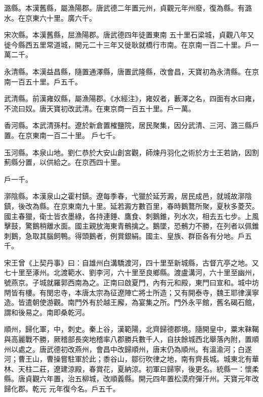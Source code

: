 \begin{pinyinscope}
 潞縣。本漢舊縣，屬漁陽郡。唐武德二年置元州，貞觀元年州廢，復為縣。有潞水。在京東六十里。廣六千。



 宋次縣。本漢舊縣，屈漁陽郡。唐武德四年徒置東南
 五十里石梁城，貞觀八年又徙今縣西五里常道城，開元二十三年又徙耿就橋行市南。在京南一百二十里。戶一萬二千。



 永清縣。本漢益昌縣，隨置通澤縣，唐置武隆縣，改會昌，天寶初為永清縣。在京南一百五十里。戶五千。



 武清縣。前漢雍奴縣，屬漁陽郡。《水經注》，雍奴者，藪澤之名，四面有水曰雍，不流曰奴。唐天寶初改武清。在東京商一百五十里。戶一萬。



 香河縣。本武清孫村。遼於新倉置榷鹽院，居民聚集，因分武清、三河、潞三縣戶置。在京東南一百二十里。
 戶七千。



 玉河縣。本泉山地。劉仁恭於大安山創宮觀，師煉丹羽化之術於方士王若訥，因割薊縣分置，以供給之。在京西四十里。



 戶一千。



 漷陰縣。本漢泉山之霍村鎮。遼每季春，弋獵於延芳澱，居民成邑，就城故漷陰鎮，後改為縣。在京東南九十里。延若澱方數百里，春時鵝鶩所聚，夏秋多菱芡。國主春獵，衛士皆衣墨綠，各持連錘、鷹食、刺鵝錐，列水次，相去五七步。上風擊鼓，驚鵝稍離水面。國主親放海東青鶻擒之。鵝墜，恐鶻力不勝，在列者以佩錐
 刺鵝，急取其腦飼鴨。得頭鵝者，例賞銀絹。國主、皇族、群臣各有分地。戶五千。



 宋王曾《上契丹事》曰：自雄州白溝驕渡河，四十里至新城縣，古督亢亭之地。又七十里至涿州。北渡範水、劉李河，六十里至良鄉縣。渡盧溝河，六十里至幽州，號燕京。子城就羅郭西南為之。正南曰啟夏門，內有元和殿，東門曰宣和。城中坊閈皆有樓。有閔忠寺，本唐太宗為征遼陣亡將士所造；又有開泰寺，魏王耶律漢寧造。皆遣朝使游觀。南門外有於越王廨，為宴集之所。門外永平館，舊名碣石館，謂和後易之。南即桑乾河。



 順州，歸化軍，中，刺史。秦上谷，漢範陽，北齊歸德郡境。隨開皇中，粟末靺鞨與高麗戰不勝，厥稽部長突地稽率八郡勝兵數千人，自扶餘城西北舉落內附，置順州以處之。唐武德初改燕州，會昌中改歸順州，唐末仍為順州。有溫渝河；白遂河；曹王山，曹操嘗駐軍於此；黍谷山，鄒衍吹律之地，南有齊長城。城東北有華林、天柱二莊，遼建涼殿，春賞花，夏納涼。初軍曰歸寧，後更名。統縣一：懷柔縣。唐貞觀六年置，治五柳城，改順義縣。開元四年置松漠府彈汗州。天寶元年改歸化郡。乾元
 元年復今名。戶五千。




\end{pinyinscope}

